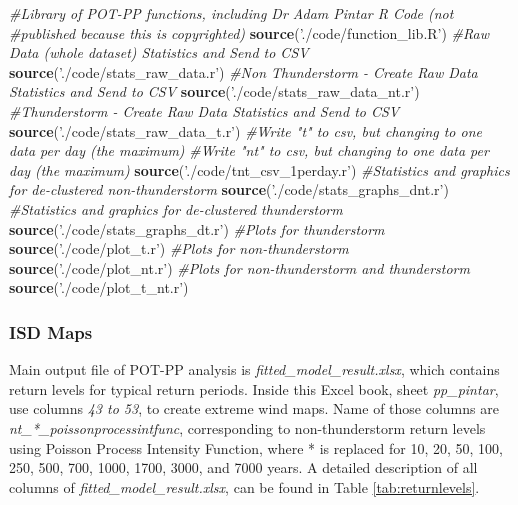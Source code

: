 \documentclass[12pt,oneside]{reedthesis}
\newenvironment{Shaded}{\begin{snugshade}}{\end{snugshade}}
\newcommand{\CommentTok}[1]{\textcolor[rgb]{0.56,0.35,0.01}{\textit{#1}}}
\newcommand{\KeywordTok}[1]{\textcolor[rgb]{0.13,0.29,0.53}{\textbf{#1}}}
\newcommand{\NormalTok}[1]{#1}
\newcommand{\StringTok}[1]{\textcolor[rgb]{0.31,0.60,0.02}{#1}}
\begin{document}
\vspace{0.4cm}
\begin{Shaded}
\begin{Highlighting}[]
    \CommentTok{#Library of POT-PP functions, including Dr Adam Pintar R Code (not }
    \CommentTok{#published because this is copyrighted)}
      \KeywordTok{source}\NormalTok{(}\StringTok{'./code/function_lib.R'}\NormalTok{)}
    \CommentTok{#Raw Data (whole dataset) Statistics and Send to CSV }
      \KeywordTok{source}\NormalTok{(}\StringTok{'./code/stats_raw_data.r'}\NormalTok{)}
    \CommentTok{#Non Thunderstorm - Create Raw Data Statistics and Send to CSV }
      \KeywordTok{source}\NormalTok{(}\StringTok{'./code/stats_raw_data_nt.r'}\NormalTok{)}
    \CommentTok{#Thunderstorm - Create Raw Data Statistics and Send to CSV}
      \KeywordTok{source}\NormalTok{(}\StringTok{'./code/stats_raw_data_t.r'}\NormalTok{)}
    \CommentTok{#Write "t" to csv, but changing to one data per day (the maximum)}
    \CommentTok{#Write "nt" to csv, but changing to one data per day (the maximum)}
      \KeywordTok{source}\NormalTok{(}\StringTok{'./code/tnt_csv_1perday.r'}\NormalTok{)}
    \CommentTok{#Statistics and graphics for de-clustered non-thunderstorm}
      \KeywordTok{source}\NormalTok{(}\StringTok{'./code/stats_graphs_dnt.r'}\NormalTok{)}
    \CommentTok{#Statistics and graphics for de-clustered thunderstorm}
      \KeywordTok{source}\NormalTok{(}\StringTok{'./code/stats_graphs_dt.r'}\NormalTok{)}
    \CommentTok{#Plots for thunderstorm}
      \KeywordTok{source}\NormalTok{(}\StringTok{'./code/plot_t.r'}\NormalTok{)}
    \CommentTok{#Plots for non-thunderstorm}
      \KeywordTok{source}\NormalTok{(}\StringTok{'./code/plot_nt.r'}\NormalTok{)}
    \CommentTok{#Plots for non-thunderstorm and thunderstorm}
      \KeywordTok{source}\NormalTok{(}\StringTok{'./code/plot_t_nt.r'}\NormalTok{)}
\end{Highlighting}
\end{Shaded}
\normalsize

\hypertarget{isd-maps}{%
\subsubsection{ISD Maps}\label{isd-maps}}

Main output file of POT-PP analysis is \emph{fitted\_model\_result.xlsx}, which contains return levels for typical return periods. Inside this Excel book, sheet \emph{pp\_pintar}, use columns \emph{43 to 53}, to create extreme wind maps. Name of those columns are \emph{nt\_*\_poissonprocessintfunc}, corresponding to non-thunderstorm return levels using Poisson Process Intensity Function, where * is replaced for 10, 20, 50, 100, 250, 500, 700, 1000, 1700, 3000, and 7000 years. A detailed description of all columns of \emph{fitted\_model\_result.xlsx}, can be found in Table \ref{tab:returnlevels}.
\end{document}
